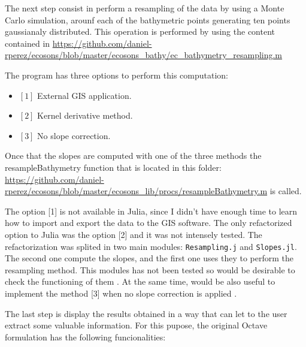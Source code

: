 \documentclass{article}[a4paper, 12pt]
\begin{document}
\vspace{1cm}

The next step consist in perform a resampling of the data by using a Monte Carlo simulation, arounf each of the bathymetric points generating ten points gaussianaly distributed. This operation is performed by using the content contained in \url{https://github.com/daniel-rperez/ecosons/blob/master/ecosons_bathy/ec_bathymetry_resampling.m}

The program has three options to perform this computation:

\begin{itemize}
    \item $[1]$ External GIS application.
    \item $[2]$ Kernel derivative method.
    \item $[3]$ No slope correction.
\end{itemize}

Once that the slopes are computed with one of the three methods the resampleBathymetry function that is located in this folder: \url{https://github.com/daniel-rperez/ecosons/blob/master/ecosons_lib/procs/resampleBathymetry.m} is called.

The option [1] is not available in Julia, since I  didn't have enough time to learn how to import and export the data to the GIS software. The only refactorized option to Julia was the option [2] and it was not intensely tested. The refactorization was splited in two main modules: \texttt{Resampling.j} and \texttt{Slopes.jl}. The second one compute the slopes, and the first one uses they to perform the resampling method. This modules has not been tested so would be desirable to check the functioning of them . At the same time, would be also useful to implement the method [3] when no slope correction is applied .

\vspace{1cm}

The last step is display the results obtained in a way that can let to the user extract some valuable information. For this pupose, the original Octave formulation has the following funcionalities:
\end{document}
